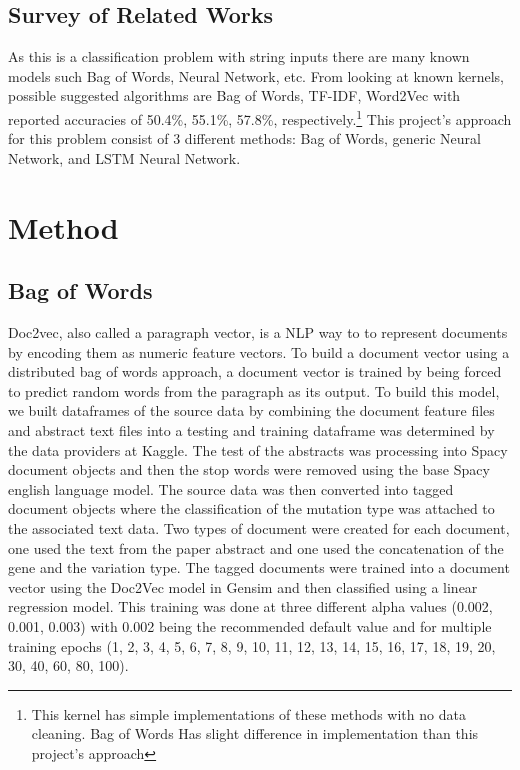 \documentclass{article}
\begin{document}
    \subsection{Survey of Related Works}
    As this is a classification problem with string inputs there are many known models such Bag of Words, Neural Network, etc.  From looking at known kernels, possible suggested algorithms are Bag of Words, TF-IDF, Word2Vec with reported accuracies of 50.4\%, 55.1\%, 57.8\%, respectively.\footnote{This kernel has simple implementations of these methods with no data cleaning.  Bag of Words Has slight difference in implementation than this project's approach}  This project's approach for this problem consist of 3 different methods: Bag of Words, generic Neural Network, and LSTM Neural Network.  
    
    \section{Method}
    \subsection{Bag of Words}
    Doc2vec, also called a paragraph vector, is a NLP way to to represent documents by encoding them as numeric feature vectors. To build a document vector using a distributed bag of words approach, a document vector is trained by being forced to predict random words from the paragraph as its output.  To build this model, we built dataframes of the source data by combining the document feature files and abstract text files into a testing and training dataframe was determined by the data providers at Kaggle. The test of the abstracts was processing into Spacy document objects and then the stop words were removed using the base Spacy english language model. The source data was then converted into tagged document objects where the classification of the mutation type was attached to the associated text data. Two types of document were created for each document, one used the text from the paper abstract and one used the concatenation of the gene and the variation type. The tagged documents were trained into a document vector using the Doc2Vec model in Gensim and then classified using a linear regression model. This training was done at three different alpha values (0.002, 0.001, 0.003) with 0.002 being the recommended default value and for multiple training epochs (1, 2, 3, 4, 5, 6, 7, 8, 9, 10, 11, 12, 13, 14, 15, 16, 17, 18, 19, 20, 30, 40, 60, 80, 100).
      
\end{document}
